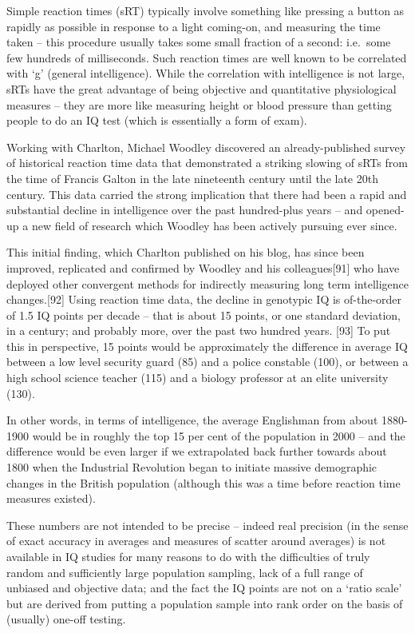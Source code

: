 \documentclass[
]{book}
\begin{document}
Simple reaction times (sRT) typically involve something like pressing a button as rapidly as possible in response to a light coming-on, and measuring the time taken -- this procedure usually takes some small fraction of a second: i.e.~some few hundreds of milliseconds. Such reaction times are well known to be correlated with `g' (general intelligence). While the correlation with intelligence is not large, sRTs have the great advantage of being objective and quantitative physiological measures -- they are more like measuring height or blood pressure than getting people to do an IQ test (which is essentially a form of exam).

Working with Charlton, Michael Woodley discovered an already-published survey of historical reaction time data that demonstrated a striking slowing of sRTs from the time of Francis Galton in the late nineteenth century until the late 20th century. This data carried the strong implication that there had been a rapid and substantial decline in intelligence over the past hundred-plus years -- and opened-up a new field of research which Woodley has been actively pursuing ever since.

This initial finding, which Charlton published on his blog, has since been improved, replicated and confirmed by Woodley and his colleagues{[}91{]} who have deployed other convergent methods for indirectly measuring long term intelligence changes.{[}92{]} Using reaction time data, the decline in genotypic IQ is of-the-order of 1.5 IQ points per decade -- that is about 15 points, or one standard deviation, in a century; and probably more, over the past two hundred years. {[}93{]} To put this in perspective, 15 points would be approximately the difference in average IQ between a low level security guard (85) and a police constable (100), or between a high school science teacher (115) and a biology professor at an elite university (130).

In other words, in terms of intelligence, the average Englishman from about 1880-1900 would be in roughly the top 15 per cent of the population in 2000 -- and the difference would be even larger if we extrapolated back further towards about 1800 when the Industrial Revolution began to initiate massive demographic changes in the British population (although this was a time before reaction time measures existed).

These numbers are not intended to be precise -- indeed real precision (in the sense of exact accuracy in averages and measures of scatter around averages) is not available in IQ studies for many reasons to do with the difficulties of truly random and sufficiently large population sampling, lack of a full range of unbiased and objective data; and the fact the IQ points are not on a `ratio scale' but are derived from putting a population sample into rank order on the basis of (usually) one-off testing.
\end{document}
